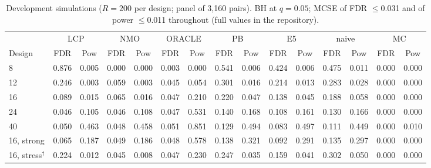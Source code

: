 \begin{table}[t]\centering\footnotesize\setlength{\tabcolsep}{2.5pt}
\caption{Development simulations ($R=200$ per design; panel of 3{,}160 pairs). BH at $q=0.05$; MCSE of FDR $\le$0.031 and of power $\le$0.011 throughout (full values in the repository).}\label{tab:simfull}
\begin{tabular}{lcccccccccccccc}
\toprule
& \multicolumn{2}{c}{LCP} & \multicolumn{2}{c}{NMO} & \multicolumn{2}{c}{ORACLE} & \multicolumn{2}{c}{PB} & \multicolumn{2}{c}{E5} & \multicolumn{2}{c}{naive} & \multicolumn{2}{c}{MC} \\
Design & FDR & Pow & FDR & Pow & FDR & Pow & FDR & Pow & FDR & Pow & FDR & Pow & FDR & Pow \\
\midrule
8 & 0.876 & 0.005 & 0.000 & 0.000 & 0.003 & 0.000 & 0.541 & 0.006 & 0.424 & 0.006 & 0.475 & 0.011 & 0.000 & 0.000 \\
12 & 0.246 & 0.003 & 0.059 & 0.003 & 0.045 & 0.054 & 0.301 & 0.016 & 0.214 & 0.013 & 0.283 & 0.028 & 0.000 & 0.000 \\
16 & 0.089 & 0.015 & 0.065 & 0.016 & 0.047 & 0.210 & 0.220 & 0.047 & 0.138 & 0.045 & 0.188 & 0.058 & 0.000 & 0.000 \\
24 & 0.046 & 0.105 & 0.046 & 0.108 & 0.047 & 0.531 & 0.140 & 0.168 & 0.108 & 0.161 & 0.130 & 0.166 & 0.000 & 0.000 \\
40 & 0.050 & 0.463 & 0.048 & 0.458 & 0.051 & 0.851 & 0.129 & 0.494 & 0.083 & 0.497 & 0.111 & 0.449 & 0.000 & 0.010 \\
16, strong & 0.065 & 0.187 & 0.049 & 0.186 & 0.048 & 0.578 & 0.138 & 0.321 & 0.092 & 0.291 & 0.135 & 0.297 & 0.000 & 0.000 \\
16, stress$^\dagger$ & 0.224 & 0.012 & 0.045 & 0.008 & 0.047 & 0.230 & 0.247 & 0.035 & 0.159 & 0.041 & 0.302 & 0.050 & 0.000 & 0.000 \\
\bottomrule
\end{tabular}
\end{table}
